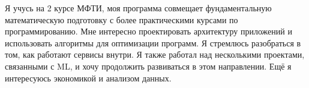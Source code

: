 Я учусь на 2 курсе МФТИ, моя программа совмещает фундаментальную математическую подготовку с более практическими курсами по программированию.
Мне интересно проектировать архитектуру приложений и использовать алгоритмы для оптимизации программ.
Я стремлюсь разобраться в том, как работают сервисы внутри. Я также работал над несколькими проектами, связанными с ML, и хочу продолжить развиваться в этом направлении.
Ещё я интересуюсь экономикой и анализом данных.
